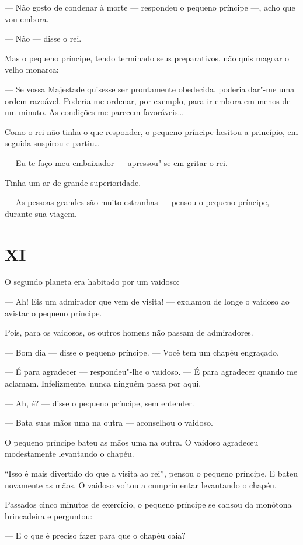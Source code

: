 \begin{Parallel}[p]{}{}
{--- Não gosto de condenar à morte --- respondeu o pequeno príncipe ---, acho
que vou embora.

--- Não --- disse o rei.

Mas o pequeno príncipe, tendo terminado seus preparativos, não quis
magoar o velho monarca:

--- Se vossa Majestade quisesse ser prontamente obedecida, poderia dar"-me
uma ordem razoável. Poderia me ordenar, por exemplo, para ir embora em
menos de um minuto. As condições me parecem favoráveis\ldots{}

Como o rei não tinha o que responder, o pequeno príncipe hesitou a
princípio, em seguida suspirou e partiu\ldots{}

--- Eu te faço meu embaixador --- apressou"-se em gritar o rei.

Tinha um ar de grande superioridade.

--- As pessoas grandes são muito estranhas --- pensou o pequeno príncipe,
durante sua viagem.

\section{XI}

O segundo planeta era habitado por um vaidoso:

--- Ah! Eis um admirador que vem de visita! --- exclamou de longe o vaidoso
ao avistar o pequeno príncipe.

Pois, para os vaidosos, os outros homens não passam de admiradores.

--- Bom dia --- disse o pequeno príncipe. --- Você tem um chapéu engraçado.

--- É para agradecer --- respondeu"-lhe o vaidoso. --- É para agradecer
quando me aclamam. Infelizmente, nunca ninguém passa por aqui.

--- Ah, é? --- disse o pequeno príncipe, sem entender.

--- Bata suas mãos uma na outra --- aconselhou o vaidoso.

O pequeno príncipe bateu as mãos uma na outra. O vaidoso agradeceu
modestamente levantando o chapéu.

``Isso é mais divertido do que a visita ao rei'', pensou o pequeno
príncipe. E bateu novamente as mãos. O vaidoso voltou a cumprimentar
levantando o chapéu.

Passados cinco minutos de exercício, o pequeno príncipe se cansou da
monótona brincadeira e perguntou:

--- E o que é preciso fazer para que o chapéu caia?

}
\end{Parallel}
